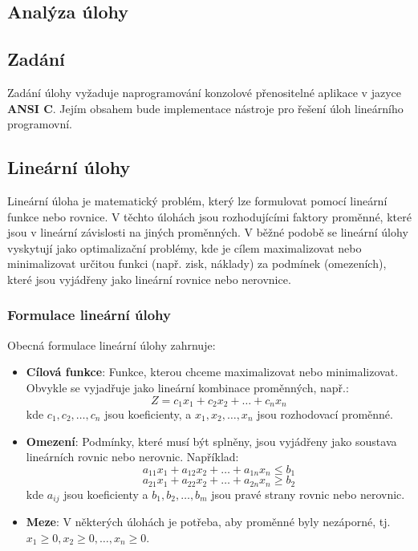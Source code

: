 \documentclass[
12pt,
a4paper,
pdftex,
czech,
titlepage
]{report}
\begin{document}
\begin{itemize}[label={}]
\chapter{Analýza úlohy}

\section{Zadání}
Zadání úlohy vyžaduje naprogramování konzolové přenositelné aplikace v jazyce \textbf{ANSI C}. Jejím obsahem bude implementace nástroje pro řešení úloh lineárního programovní.

\section{Lineární úlohy}

Lineární úloha je matematický problém, který lze formulovat pomocí lineární funkce nebo rovnice. V těchto úlohách jsou rozhodujícími faktory proměnné, které jsou v lineární závislosti na jiných proměnných. V běžné podobě se lineární úlohy vyskytují jako optimalizační problémy, kde je cílem maximalizovat nebo minimalizovat určitou funkci (např. zisk, náklady) za podmínek (omezeních), které jsou vyjádřeny jako lineární rovnice nebo nerovnice.

\subsection*{Formulace lineární úlohy}
Obecná formulace lineární úlohy zahrnuje:
\begin{itemize}
  \item \textbf{Cílová funkce}: Funkce, kterou chceme maximalizovat nebo minimalizovat. Obvykle se vyjadřuje jako lineární kombinace proměnných, např.:
  \[
  Z = c_1 x_1 + c_2 x_2 + \dots + c_n x_n
  \]
  kde \( c_1, c_2, \dots, c_n \) jsou koeficienty, a \( x_1, x_2, \dots, x_n \) jsou rozhodovací proměnné.
  \item \textbf{Omezení}: Podmínky, které musí být splněny, jsou vyjádřeny jako soustava lineárních rovnic nebo nerovnic. Například:
  \[
  a_{11} x_1 + a_{12} x_2 + \dots + a_{1n} x_n \leq b_1
  \]
  \[
  a_{21} x_1 + a_{22} x_2 + \dots + a_{2n} x_n \geq b_2
  \]
  kde \( a_{ij} \) jsou koeficienty a \( b_1, b_2, \dots, b_m \) jsou pravé strany rovnic nebo nerovnic.
  \item \textbf{Meze}: V některých úlohách je potřeba, aby proměnné byly nezáporné, tj. \( x_1 \geq 0, x_2 \geq 0, \dots, x_n \geq 0 \).
\end{itemize}


\end{itemize}
\end{document}
